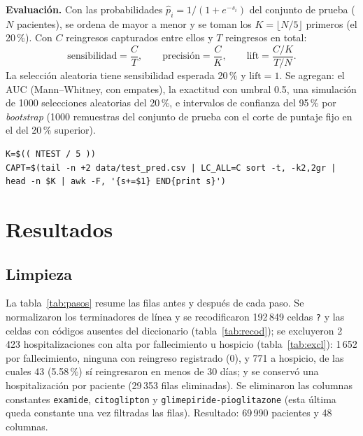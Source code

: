 \documentclass[11pt,a4paper]{article}
\newcommand{\cod}[1]{\texttt{#1}}
\begin{document}
\textbf{Evaluación.} Con las probabilidades $\hat p_i=1/(1+e^{-s_i})$ del conjunto de prueba ($N$ pacientes), se ordena de mayor a menor y se toman los $K=\lfloor N/5\rfloor$ primeros (el 20\,\%). Con $C$ reingresos capturados entre ellos y $T$ reingresos en total:
\[
\text{sensibilidad}=\frac{C}{T},\qquad
\text{precisión}=\frac{C}{K},\qquad
\text{lift}=\frac{C/K}{T/N}.
\]
La selección aleatoria tiene sensibilidad esperada 20\,\% y $\text{lift}=1$. Se agregan: el AUC (Mann--Whitney, con empates), la exactitud con umbral 0.5, una simulación de 1000 selecciones aleatorias del 20\,\%, e intervalos de confianza del 95\,\% por \emph{bootstrap} (1000 remuestras del conjunto de prueba con el corte de puntaje fijo en el del 20\,\% superior).
\begin{lstlisting}
K=$(( NTEST / 5 ))
CAPT=$(tail -n +2 data/test_pred.csv | LC_ALL=C sort -t, -k2,2gr | head -n $K | awk -F, '{s+=$1} END{print s}')
\end{lstlisting}

% 
\section{Resultados}
\subsection{Limpieza}
La tabla~\ref{tab:pasos} resume las filas antes y después de cada paso. Se normalizaron los terminadores de línea y se recodificaron 192\,849 celdas \cod{?} y las celdas con códigos ausentes del diccionario (tabla~\ref{tab:recod}); se excluyeron 2\,423 hospitalizaciones con alta por fallecimiento u hospicio (tabla~\ref{tab:excl}): 1\,652 por fallecimiento, ninguna con reingreso registrado (0), y 771 a hospicio, de las cuales 43 (5.58\,\%) sí reingresaron en menos de 30 días; y se conservó una hospitalización por paciente (29\,353 filas eliminadas). Se eliminaron las columnas constantes \cod{examide}, \cod{citoglipton} y \cod{glimepiride-pioglitazone} (esta última queda constante una vez filtradas las filas). Resultado: 69\,990 pacientes y 48 columnas.
\end{document}
